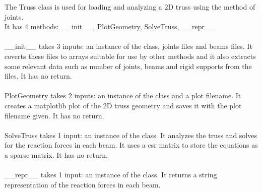 \documentclass{article}
\begin{document}
\noindent
The Truss class is used for loading and analyzing a 2D truss using the method
of joints.\\
It has 4 methods: __init__, PlotGeometry, SolveTruss, __repr__\\
\\
__init__ takes 3 inputs: an instance of the class, joints files and beams
files. It coverts these files to arrays suitable for use by other methods and
it also extracts some relevant data such as number of joints, beams and
rigid supports from the files. It has no return.\\
\\
PlotGeometry takes 2 inputs: an instance of the class and a plot filename. It
creates a matplotlib plot of the 2D truss geometry and saves it with the plot
filename given. It has no return.\\
\\
SolveTruss takes 1 input: an instance of the class. It analyzes the truss and
solves for the reaction forces in each beam. It uses a csr matrix to store the
equations as a sparse matrix. It has no return.\\
\\
__repr__ takes 1 input: an instance of the class. It returns a string
representation of the reaction forces in each beam.\\
\end{document}

